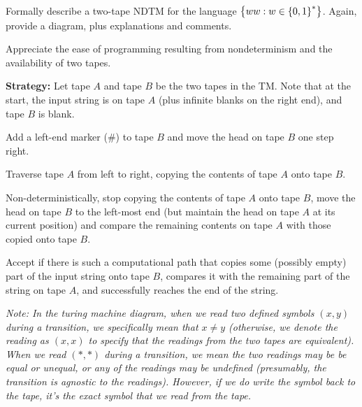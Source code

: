 \begin{problem}
  Formally describe a two-tape NDTM for the language
  $\left\{ ww : w \in \left\{0, 1\right\}^*\right\}$.
  Again, provide a diagram, plus explanations and comments.

  \step
  Appreciate the ease of programming resulting from nondeterminism
  and the availability of two tapes.
\end{problem}
\begin{Answer}
  \textbf{Strategy:}
  Let tape $A$ and tape $B$ be the two tapes in the TM.
  Note that at the start, the input string is on tape $A$
  (plus infinite blanks on the right end), and tape $B$ is blank.

  \begin{enumroman}
    \item Add a left-end marker ($\#$) to tape $B$ and move the head
      on tape $B$ one step right.

    \item Traverse tape $A$ from left to right, copying the contents of tape $A$
      onto tape $B$.

    \item Non-deterministically, stop copying the contents of tape $A$ onto tape $B$,
      move the head on tape $B$ to the left-most end (but maintain the head on tape $A$
      at its current position) and compare the remaining contents on tape $A$
      with those copied onto tape $B$.

    \item Accept if there is such a computational path that copies some (possibly empty)
      part of the input string onto tape $B$, compares it with the remaining part
      of the string on tape $A$, and successfully reaches the end of the string.
  \end{enumroman}

  \newpage
  \emph{
    Note: In the turing machine diagram,
    when we read two defined symbols $(x, y)$ during a transition,
    we specifically mean that $x \neq y$
    (otherwise, we denote the reading as $(x, x)$
    to specify that the readings from the two tapes are equivalent).
    When we read $(*, *)$ during a transition,
    we mean the two readings may be be equal or unequal,
    or any of the readings may be undefined (presumably, the transition
    is agnostic to the readings). However, if we do write the symbol
    back to the tape, it's the exact symbol that we read from the tape.
  }

  \bigskip
  

\end{Answer}
